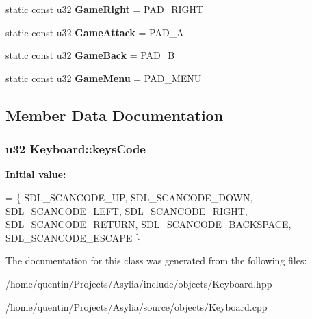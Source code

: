 \begin{DoxyCompactItemize}
\item 
\hypertarget{classKeyboard_ac802f359882ec1a1cb973c0c2ea4cf33}{static const u32 {\bfseries Game\-Right} = P\-A\-D\-\_\-\-R\-I\-G\-H\-T}\label{classKeyboard_ac802f359882ec1a1cb973c0c2ea4cf33}

\item 
\hypertarget{classKeyboard_a57b7df9b59dc8f0d236bdcb31cd6218a}{static const u32 {\bfseries Game\-Attack} = P\-A\-D\-\_\-\-A}\label{classKeyboard_a57b7df9b59dc8f0d236bdcb31cd6218a}

\item 
\hypertarget{classKeyboard_a54e2a9e16cf0abc68a69fb55747faac5}{static const u32 {\bfseries Game\-Back} = P\-A\-D\-\_\-\-B}\label{classKeyboard_a54e2a9e16cf0abc68a69fb55747faac5}

\item 
\hypertarget{classKeyboard_a10b9fae028e00cc0c20aa63f420f9ebc}{static const u32 {\bfseries Game\-Menu} = P\-A\-D\-\_\-\-M\-E\-N\-U}\label{classKeyboard_a10b9fae028e00cc0c20aa63f420f9ebc}

\end{DoxyCompactItemize}


\subsection{Member Data Documentation}
\hypertarget{classKeyboard_ae7ca0673df6ed9edf8bbb15dc4a75e90}{
\subsubsection[{keys\-Code}]{\setlength{\rightskip}{0pt plus 5cm}u32 Keyboard\-::keys\-Code\hspace{0.3cm}{\ttfamily [static]}}}\label{classKeyboard_ae7ca0673df6ed9edf8bbb15dc4a75e90}
{\bfseries Initial value\-:}
\begin{DoxyCode}
= \{
    SDL\_SCANCODE\_UP,
    SDL\_SCANCODE\_DOWN,
    SDL\_SCANCODE\_LEFT,
    SDL\_SCANCODE\_RIGHT,
    SDL\_SCANCODE\_RETURN,
    SDL\_SCANCODE\_BACKSPACE,
    SDL\_SCANCODE\_ESCAPE
\}
\end{DoxyCode}


The documentation for this class was generated from the following files\-:\begin{DoxyCompactItemize}
\item 
/home/quentin/\-Projects/\-Asylia/include/objects/Keyboard.\-hpp\item 
/home/quentin/\-Projects/\-Asylia/source/objects/Keyboard.\-cpp\end{DoxyCompactItemize}
